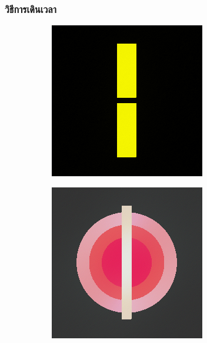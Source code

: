 \documentclass[xcolor=dvipsnames, xetex,serif]{beamer}
\numberwithin{equation}{section}
\begin{document}
		\begin{frame}
			\frametitle{วิธีการเดินเวลา}
			\begin{figure}[H]
				\centering
				\begin{subfigure}{0.3\linewidth}
					\centering
					\includegraphics[width=0.7\linewidth]{images/result_ex1/timemarch01.png}
				\end{subfigure}
				\begin{subfigure}{0.3\linewidth}
					\centering
					\includegraphics[width=0.7\linewidth]{images/result_ex1/timemarch02.png}
				\end{subfigure}
				\vspace{1cm}
				\begin{subfigure}{0.3\linewidth}
					\centering

\end{subfigure}
\end{figure}
\end{frame}
\end{document}
